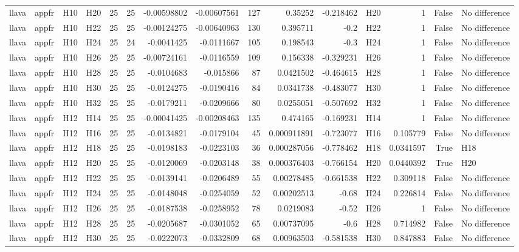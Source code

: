 \begin{longtable}{llllrrrrrrrlrrl}
llava & appfr & H10 & H20 & 25 & 25 & -0.00598802 & -0.00607561 & 127 & 0.35252 & -0.218462 & H20 & 1 & False & No difference \\
llava & appfr & H10 & H22 & 25 & 25 & -0.00124275 & -0.00640963 & 130 & 0.395711 & -0.2 & H22 & 1 & False & No difference \\
llava & appfr & H10 & H24 & 25 & 24 & -0.0041425 & -0.0111667 & 105 & 0.198543 & -0.3 & H24 & 1 & False & No difference \\
llava & appfr & H10 & H26 & 25 & 25 & -0.00724161 & -0.0116559 & 109 & 0.156338 & -0.329231 & H26 & 1 & False & No difference \\
llava & appfr & H10 & H28 & 25 & 25 & -0.0104683 & -0.015866 & 87 & 0.0421502 & -0.464615 & H28 & 1 & False & No difference \\
llava & appfr & H10 & H30 & 25 & 25 & -0.0124275 & -0.0190416 & 84 & 0.0341738 & -0.483077 & H30 & 1 & False & No difference \\
llava & appfr & H10 & H32 & 25 & 25 & -0.0179211 & -0.0209666 & 80 & 0.0255051 & -0.507692 & H32 & 1 & False & No difference \\
llava & appfr & H12 & H14 & 25 & 25 & -0.00041425 & -0.00208463 & 135 & 0.474165 & -0.169231 & H14 & 1 & False & No difference \\
llava & appfr & H12 & H16 & 25 & 25 & -0.0134821 & -0.0179104 & 45 & 0.000911891 & -0.723077 & H16 & 0.105779 & False & No difference \\
llava & appfr & H12 & H18 & 25 & 25 & -0.0198183 & -0.0223103 & 36 & 0.000287056 & -0.778462 & H18 & 0.0341597 & True & H18 \\
llava & appfr & H12 & H20 & 25 & 25 & -0.0120069 & -0.0203148 & 38 & 0.000376403 & -0.766154 & H20 & 0.0440392 & True & H20 \\
llava & appfr & H12 & H22 & 25 & 25 & -0.0139141 & -0.0206489 & 55 & 0.00278485 & -0.661538 & H22 & 0.309118 & False & No difference \\
llava & appfr & H12 & H24 & 25 & 25 & -0.0148048 & -0.0254059 & 52 & 0.00202513 & -0.68 & H24 & 0.226814 & False & No difference \\
llava & appfr & H12 & H26 & 25 & 25 & -0.0187538 & -0.0258952 & 78 & 0.0219083 & -0.52 & H26 & 1 & False & No difference \\
llava & appfr & H12 & H28 & 25 & 25 & -0.0205687 & -0.0301052 & 65 & 0.00737095 & -0.6 & H28 & 0.714982 & False & No difference \\
llava & appfr & H12 & H30 & 25 & 25 & -0.0222073 & -0.0332809 & 68 & 0.00963503 & -0.581538 & H30 & 0.847883 & False & No difference \\

\end{longtable}
